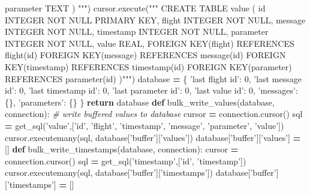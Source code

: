 \documentclass[12pt,oneside]{reedthesis}
\newenvironment{Shaded}{\begin{snugshade}}{\end{snugshade}}
\newcommand{\KeywordTok}[1]{\textcolor[rgb]{0.13,0.29,0.53}{\textbf{#1}}}
\newcommand{\DecValTok}[1]{\textcolor[rgb]{0.00,0.00,0.81}{#1}}
\newcommand{\StringTok}[1]{\textcolor[rgb]{0.31,0.60,0.02}{#1}}
\newcommand{\CommentTok}[1]{\textcolor[rgb]{0.56,0.35,0.01}{\textit{#1}}}
\newcommand{\ControlFlowTok}[1]{\textcolor[rgb]{0.13,0.29,0.53}{\textbf{#1}}}
\newcommand{\OperatorTok}[1]{\textcolor[rgb]{0.81,0.36,0.00}{\textbf{#1}}}
\newcommand{\NormalTok}[1]{#1}
\theoremstyle{definition}
\theoremstyle{definition}
\theoremstyle{definition}
\theoremstyle{remark}
\begin{document}
\begin{Shaded}
\begin{Highlighting}[]
{{{{{\StringTok{        parameter TEXT}
\StringTok{        )}
\StringTok{      """}\NormalTok{)}
\NormalTok{    cursor.execute(}\StringTok{"""}
\StringTok{    CREATE TABLE value (}
\StringTok{        id INTEGER NOT NULL PRIMARY KEY,}
\StringTok{        flight INTEGER NOT NULL,}
\StringTok{        message INTEGER NOT NULL,}
\StringTok{        timestamp INTEGER NOT NULL,}
\StringTok{        parameter INTEGER NOT NULL,}
\StringTok{        value REAL,}
\StringTok{        FOREIGN KEY(flight) REFERENCES flight(id)}
\StringTok{        FOREIGN KEY(message) REFERENCES message(id)}
\StringTok{        FOREIGN KEY(timestamp) REFERENCES timestamp(id)}
\StringTok{        FOREIGN KEY(parameter) REFERENCES parameter(id)}
\StringTok{    )"""}\NormalTok{)}
\NormalTok{    database }\OperatorTok{=}\NormalTok{ \{}
        \StringTok{'last flight id'}\NormalTok{: }\DecValTok{0}\NormalTok{,}
        \StringTok{'last message id'}\NormalTok{: }\DecValTok{0}\NormalTok{,}
        \StringTok{'last timestamp id'}\NormalTok{: }\DecValTok{0}\NormalTok{,}
        \StringTok{'last parameter id'}\NormalTok{: }\DecValTok{0}\NormalTok{,}
        \StringTok{'last value id'}\NormalTok{: }\DecValTok{0}\NormalTok{,}
        \StringTok{'messages'}\NormalTok{: \{\},}
        \StringTok{'parameters'}\NormalTok{: \{\}}
\NormalTok{    \}}
    \ControlFlowTok{return}\NormalTok{ database}
\KeywordTok{def}\NormalTok{ bulk_write_values(database, connection):}
    \CommentTok{# write buffered values to database}
\NormalTok{    cursor }\OperatorTok{=}\NormalTok{ connection.cursor()}
\NormalTok{    sql }\OperatorTok{=}\NormalTok{ get_sql(}\StringTok{'value'}\NormalTok{,[}\StringTok{'id'}\NormalTok{, }\StringTok{'flight'}\NormalTok{, }\StringTok{'timestamp'}\NormalTok{, }\StringTok{'message'}\NormalTok{, }
      \StringTok{'parameter'}\NormalTok{, }\StringTok{'value'}\NormalTok{])}
\NormalTok{    cursor.executemany(sql, database[}\StringTok{'buffer'}\NormalTok{][}\StringTok{'values'}\NormalTok{])}
\NormalTok{    database[}\StringTok{'buffer'}\NormalTok{][}\StringTok{'values'}\NormalTok{] }\OperatorTok{=}\NormalTok{ []}
\KeywordTok{def}\NormalTok{ bulk_write_timestamps(database, connection):}
\NormalTok{    cursor }\OperatorTok{=}\NormalTok{ connection.cursor()}
\NormalTok{    sql }\OperatorTok{=}\NormalTok{ get_sql(}\StringTok{'timestamp'}\NormalTok{,[}\StringTok{'id'}\NormalTok{, }\StringTok{'timestamp'}\NormalTok{])}
\NormalTok{    cursor.executemany(sql, database[}\StringTok{'buffer'}\NormalTok{][}\StringTok{'timestamps'}\NormalTok{])}
\NormalTok{    database[}\StringTok{'buffer'}\NormalTok{][}\StringTok{'timestamps'}\NormalTok{] }\OperatorTok{=}\NormalTok{ []}
}}}}}
\end{Highlighting}
\end{Shaded}
\end{document}
